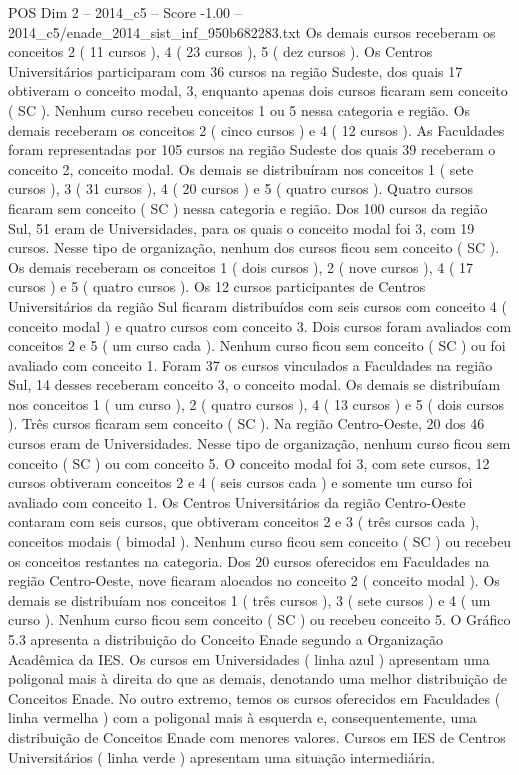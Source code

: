 \begin{textsample}{POS Dim 2 – 2014\_c5 – Score -1.00 – 2014\_c5/enade\_2014\_sist\_inf\_950b682283.txt}
Os demais cursos receberam os conceitos 2 ( 11 cursos ), 4 ( 23 cursos ), 5 ( dez cursos ).
Os Centros Universitários participaram com 36 cursos na região Sudeste, dos quais 17 obtiveram o conceito modal, 3, enquanto apenas dois cursos ficaram sem conceito ( SC ).
Nenhum curso recebeu conceitos 1 ou 5 nessa categoria e região.
Os demais receberam os conceitos 2 ( cinco cursos ) e 4 ( 12 cursos ).
As Faculdades foram representadas por 105 cursos na região Sudeste dos quais 39 receberam o conceito 2, conceito modal.
Os demais se distribuíram nos conceitos 1 ( sete cursos ), 3 ( 31 cursos ), 4 ( 20 cursos ) e 5 ( quatro cursos ).
Quatro cursos ficaram sem conceito ( SC ) nessa categoria e região.
Dos 100 cursos da região Sul, 51 eram de Universidades, para os quais o conceito modal foi 3, com 19 cursos.
Nesse tipo de organização, nenhum dos cursos ficou sem conceito ( SC ).
Os demais receberam os conceitos 1 ( dois cursos ), 2 ( nove cursos ), 4 ( 17 cursos ) e 5 ( quatro cursos ).
Os 12 cursos participantes de Centros Universitários da região Sul ficaram distribuídos com seis cursos com conceito 4 ( conceito modal ) e quatro cursos com conceito 3.
Dois cursos foram avaliados com conceitos 2 e 5 ( um curso cada ).
Nenhum curso ficou sem conceito ( SC ) ou foi avaliado com conceito 1.
Foram 37 os cursos vinculados a Faculdades na região Sul, 14 desses receberam conceito 3, o conceito modal.
Os demais se distribuíam nos conceitos 1 ( um curso ), 2 ( quatro cursos ), 4 ( 13 cursos ) e 5 ( dois cursos ).
Três cursos ficaram sem conceito ( SC ).
Na região Centro-Oeste, 20 dos 46 cursos eram de Universidades.
Nesse tipo de organização, nenhum curso ficou sem conceito ( SC ) ou com conceito 5.
O conceito modal foi 3, com sete cursos, 12 cursos obtiveram conceitos 2 e 4 ( seis cursos cada ) e somente um curso foi avaliado com conceito 1.
Os Centros Universitários da região Centro-Oeste contaram com seis cursos, que obtiveram conceitos 2 e 3 ( três cursos cada ), conceitos modais ( bimodal ).
Nenhum curso ficou sem conceito ( SC ) ou recebeu os conceitos restantes na categoria.
Dos 20 cursos oferecidos em Faculdades na região Centro-Oeste, nove ficaram alocados no conceito 2 ( conceito modal ).
Os demais se distribuíam nos conceitos 1 ( três cursos ), 3 ( sete cursos ) e 4 ( um curso ).
Nenhum curso ficou sem conceito ( SC ) ou recebeu conceito 5.
O Gráfico 5.3 apresenta a distribuição do Conceito Enade segundo a Organização Acadêmica da IES.
Os cursos em Universidades ( linha azul ) apresentam uma poligonal mais à direita do que as demais, denotando uma melhor distribuição de Conceitos Enade.
No outro extremo, temos os cursos oferecidos em Faculdades ( linha vermelha ) com a poligonal mais à esquerda e, consequentemente, uma distribuição de Conceitos Enade com menores valores.
Cursos em IES de Centros Universitários ( linha verde ) apresentam uma situação intermediária.

\end{textsample}
